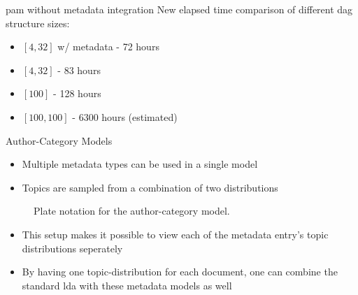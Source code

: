 \begin{frame}{\insertsubsection}{\gls{pam} without metadata integration}
	New elapsed time comparison of different \gls{dag} structure sizes:
	\begin{itemize}
		\item $[ 4, 32 ]$ w/ metadata - 72 hours
		\item $[ 4, 32 ]$ - 83 hours
		\item $[ 100 ]$ - 128 hours
		\item $[ 100, 100]$ - 6300 hours (estimated)
	\end{itemize}
\end{frame}

\begin{frame}{\insertsubsection}{Author-Category Models}
	\begin{itemize}
		\item Multiple metadata types can be used in a single model
		\item Topics are sampled from a combination of two distributions
	\end{itemize}
	\begin{figure}
		\centering
		\resizebox{0.35\columnwidth}{!}{%
			
		}
		\caption{Plate notation for the author-category model.}
	\end{figure}
	\begin{itemize}
		\item<2> This setup makes it possible to view each of the metadata entry's topic distributions seperately
		\item<3> By having one topic-distribution for each document, one can combine the standard \gls{lda} with these metadata models as well
	\end{itemize}
\end{frame}

